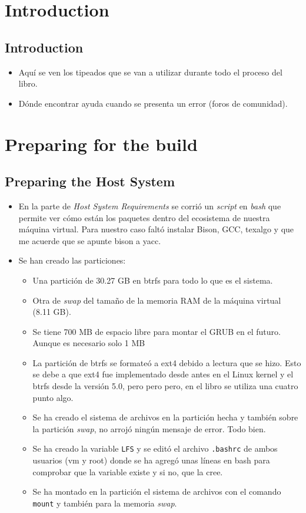 \documentclass{article}
\begin{document}
\section{Introduction}

\subsection{Introduction}

\begin{itemize}
  \item Aquí se ven los tipeados que se van a utilizar durante todo el proceso del libro.
  \item Dónde encontrar ayuda cuando se presenta un error (foros de comunidad).
\end{itemize}

\section{Preparing for the build}

\subsection{Preparing the Host System}

\begin{itemize}
  \item En la parte de \textit{Host System Requirements} se corrió un \textit{script} en \textit{bash} que permite ver cómo están los paquetes dentro del ecosistema de nuestra máquina virtual. Para nuestro caso faltó instalar Bison, GCC, texalgo y que me acuerde que se apunte bison a yacc.
  \item Se han creado las particiones:
        \begin{itemize}
          \item Una partición de 30.27 GB en btrfs para todo lo que es el sistema.
          \item Otra de \textit{swap} del tamaño de la memoria RAM de la máquina virtual (8.11 GB).
          \item Se tiene 700 MB de espacio libre para montar el GRUB en el futuro. Aunque es necesario solo 1 MB
          \item La partición de btrfs se formateó a ext4 debido a lectura que se hizo. Esto se debe a que ext4 fue implementado desde antes en el Linux kernel y el btrfs desde la versión 5.0, pero pero pero, en el libro se utiliza una cuatro punto algo.
          \item Se ha creado el sistema de archivos en la partición hecha y también sobre la partición \textit{swap}, no arrojó ningún mensaje de error. Todo bien.
          \item Se ha creado la variable \texttt{LFS} y se editó el archivo \texttt{.bashrc} de ambos usuarios (vm y root) donde se ha agregó unas líneas en bash para comprobar que la variable existe y si no, que la cree.
          \item Se ha montado en la partición el sistema de archivos con el comando \texttt{mount} y también para la memoria \textit{swap}.
        \end{itemize}
\end{itemize}
\end{document}
